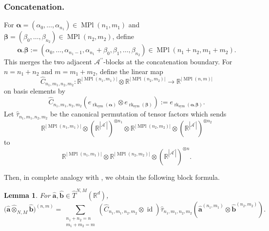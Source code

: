 \documentclass{amsart}
\newtheorem{lemma}[theorem]{Lemma}
\theoremstyle{definition}
\theoremstyle{remark}
\newcommand{\dott}{.}
\begin{document}
\subsubsection{Concatenation.}
For
$\boldsymbol{\alpha}
=
(\alpha_0,\ldots,\alpha_{n_1})
\in\operatorname{MPl}(n_1,m_1)$
and
$\boldsymbol{\beta}
=
(\beta_0,\ldots,\beta_{n_2})
\in\operatorname{MPl}(n_2,m_2)$,
define
\[
    \boldsymbol{\alpha}\dott\boldsymbol{\beta}
    :=
    \left(
        \alpha_0,\ldots,\alpha_{n_1-1},
        \alpha_{n_1}+\beta_0,
        \beta_1,\ldots,\beta_{n_2}
    \right)
    \in
    \operatorname{MPl}(n_1+n_2,m_1+m_2).
\]
This merges the two adjacent
$\mathcal{A}^{\prime\prime}$-blocks at the concatenation boundary.
For $n=n_1+n_2$ and $m=m_1+m_2$, define the linear map
\[
    \widehat{C}_{n_1,m_1,n_2,m_2}
    \colon
    \mathbb{R}^{|\operatorname{MPl}(n_1,m_1)|}
    \otimes
    \mathbb{R}^{|\operatorname{MPl}(n_2,m_2)|}
    \longrightarrow
    \mathbb{R}^{|\operatorname{MPl}(n,m)|}
\]
on basis elements by
\[
    \widehat{C}_{n_1,m_1,n_2,m_2}
    \left(
        e_{\operatorname{rk}_{\mathrm{sym}}(\boldsymbol{\alpha})}
        \otimes
        e_{\operatorname{rk}_{\mathrm{sym}}(\boldsymbol{\beta})}
    \right)
    :=
    e_{\operatorname{rk}_{\mathrm{sym}}
    \left(
        \boldsymbol{\alpha}\dott\boldsymbol{\beta}
    \right)}.
\]
Let $\widehat{\tau}_{n_1,m_1,n_2,m_2}$ be the canonical permutation of
tensor factors which sends
\[
    \mathbb{R}^{|\operatorname{MPl}(n_1,m_1)|}
    \otimes
    \left(
        \mathbb{R}^{|\mathcal{A}^{\prime}|}
    \right)^{\otimes n_1}
    \otimes
    \mathbb{R}^{|\operatorname{MPl}(n_2,m_2)|}
    \otimes
    \left(
        \mathbb{R}^{|\mathcal{A}^{\prime}|}
    \right)^{\otimes n_2}
\]
to
\[
    \mathbb{R}^{|\operatorname{MPl}(n_1,m_1)|}
    \otimes
    \mathbb{R}^{|\operatorname{MPl}(n_2,m_2)|}
    \otimes
    \left(
        \mathbb{R}^{|\mathcal{A}^{\prime}|}
    \right)^{\otimes n}.
\]

Then, in complete analogy with , we obtain
the following block formula.

\begin{lemma}
\label{lem:symmetrized_concatenation}
For
$\widehat{\mathbf{a}},\widehat{\mathbf{b}}
\in\widehat{T}^{N,M}(\mathbb{R}^{d})$,
\[
    \bigl(
        \widehat{\mathbf{a}}
        \widehat{\otimes}_{N,M}
        \widehat{\mathbf{b}}
    \bigr)^{(n,m)}
    =
    \sum_{\substack{
        n_1+n_2=n\\
        m_1+m_2=m
    }}
    \left(
        \widehat{C}_{n_1,m_1,n_2,m_2}
        \otimes
        \operatorname{id}
    \right)
    \widehat{\tau}_{n_1,m_1,n_2,m_2}
    \left(
        \widehat{\mathbf{a}}^{(n_1,m_1)}
        \otimes
        \widehat{\mathbf{b}}^{(n_2,m_2)}
    \right).
\]
\end{lemma}
\end{document}
